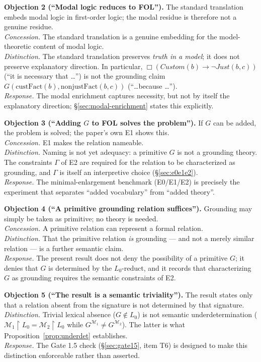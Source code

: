\documentclass[11pt]{article}
\theoremstyle{plain}
\theoremstyle{definition}
\theoremstyle{remark}
\begin{document}
\medskip
\textbf{Objection 2 (``Modal logic reduces to FOL'').} The standard
translation embeds modal logic in first-order logic; the modal residue
is therefore not a genuine residue.\\
\emph{Concession.} The standard translation is a genuine embedding for
the model-theoretic content of modal logic.\\
\emph{Distinction.} The standard translation preserves \emph{truth in
a model}; it does not preserve explanatory direction. In particular,
$\Box(Custom(b) \to \neg Just(b,c))$ (``it is necessary that \dots'')
is not the grounding claim $G(\mathrm{custFact}(b),
\mathrm{nonjustFact}(b,c))$ (``\dots because \dots'').\\
\emph{Response.} The modal enrichment captures necessity, but not by
itself the explanatory direction; \S\ref{sec:modal-enrichment} states
this explicitly.

\medskip
\textbf{Objection 3 (``Adding $G$ to FOL solves the problem'').} If $G$
can be added, the problem is solved; the paper's own E1 shows this.\\
\emph{Concession.} E1 makes the relation nameable.\\
\emph{Distinction.} Naming is not yet adequacy: a primitive $G$ is not
a grounding theory. The constraints $\Gamma$ of E2 are required for the
relation to be characterized as grounding, and $\Gamma$ is itself an
interpretive choice (\S\ref{sec:e0e1e2}).\\
\emph{Response.} The minimal-enlargement benchmark (E0/E1/E2) is
precisely the experiment that separates ``added vocabulary'' from
``added theory''.

\medskip
\textbf{Objection 4 (``A primitive grounding relation suffices'').}
Grounding may simply be taken as primitive; no theory is needed.\\
\emph{Concession.} A primitive relation can represent a formal
relation.\\
\emph{Distinction.} That the primitive relation \emph{is} grounding ---
and not a merely similar relation --- is a further semantic claim.\\
\emph{Response.} The present result does not deny the possibility of a
primitive $G$; it denies that $G$ is determined by the $L_0$-reduct,
and it records that characterizing $G$ as grounding requires the
semantic constraints of E2.

\medskip
\textbf{Objection 5 (``The result is a semantic triviality'').} The
result states only that a relation absent from the signature is not
determined by that signature.\\
\emph{Distinction.} Trivial lexical absence ($G \notin L_0$) is not
semantic underdetermination ($\mathcal M_1\!\upharpoonright L_0 =
\mathcal M_2\!\upharpoonright L_0$ while $G^{\mathcal M_1} \neq
G^{\mathcal M_2}$). The latter is what
Proposition~\ref{prop:underdet} establishes.\\
\emph{Response.} The Gate 1.5 check (\S\ref{sec:gate15}, item T6) is
designed to make this distinction enforceable rather than asserted.
\end{document}
